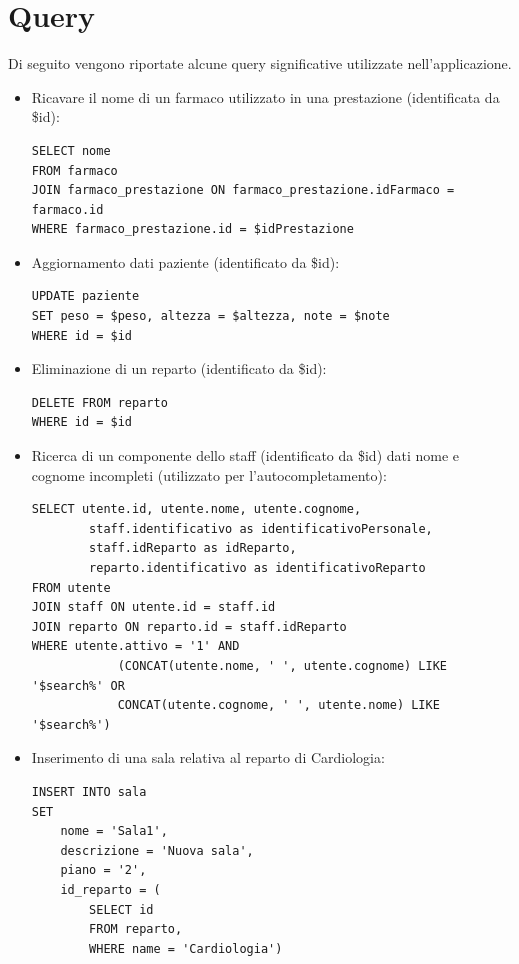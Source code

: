 \documentclass[paper=a4, fontsize=11pt,x11names]{report}
\begin{document}
\chapter{Query}
Di seguito vengono riportate alcune query significative utilizzate nell'applicazione.
\begin{itemize}
\item Ricavare il nome di un farmaco utilizzato in una prestazione (identificata da \$id):
\begin{verbatim}
SELECT nome
FROM farmaco
JOIN farmaco_prestazione ON farmaco_prestazione.idFarmaco = farmaco.id
WHERE farmaco_prestazione.id = $idPrestazione 
\end{verbatim}

\item Aggiornamento dati paziente (identificato da \$id):
\begin{verbatim}
UPDATE paziente
SET peso = $peso, altezza = $altezza, note = $note
WHERE id = $id 
\end{verbatim}

\item Eliminazione di un reparto (identificato da \$id):
\begin{verbatim}
DELETE FROM reparto
WHERE id = $id 
\end{verbatim}

\item Ricerca di un componente dello staff (identificato da \$id) dati nome e cognome incompleti (utilizzato per l'autocompletamento):
\begin{verbatim}
SELECT utente.id, utente.nome, utente.cognome, 
        staff.identificativo as identificativoPersonale, 
        staff.idReparto as idReparto,
        reparto.identificativo as identificativoReparto 
FROM utente
JOIN staff ON utente.id = staff.id
JOIN reparto ON reparto.id = staff.idReparto
WHERE utente.attivo = '1' AND
            (CONCAT(utente.nome, ' ', utente.cognome) LIKE '$search%' OR 
            CONCAT(utente.cognome, ' ', utente.nome) LIKE '$search%')
\end{verbatim}

\item Inserimento di una sala relativa al reparto di Cardiologia:
\begin{verbatim}
INSERT INTO sala 
SET 
	nome = 'Sala1', 
	descrizione = 'Nuova sala', 
	piano = '2', 
    id_reparto = (
    	SELECT id
        FROM reparto,
        WHERE name = 'Cardiologia')
\end{verbatim}

\end{itemize}
\end{document}

